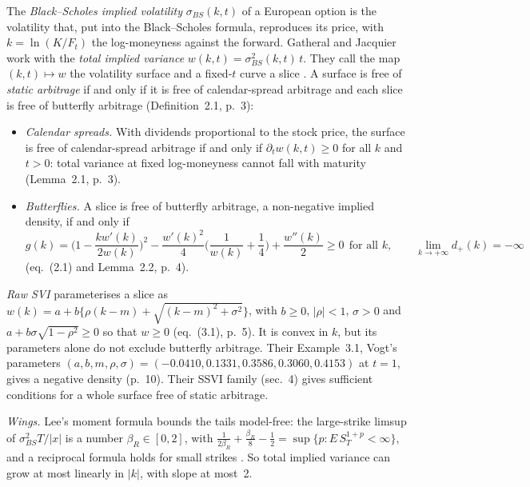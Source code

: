 \begin{qfdefinition}\label{def:implied-volatility-surface}
 The \emph{Black--Scholes implied volatility} $\sigma_{BS}(k,t)$ of a European option is the volatility that, put into the Black--Scholes formula, reproduces its price, with $k=\ln(K/F_t)$ the log-moneyness against the forward. Gatheral and Jacquier work with the \emph{total implied variance} $w(k,t)=\sigma_{BS}^2(k,t)\,t$. They call the map $(k,t)\mapsto w$ the volatility surface and a fixed-$t$ curve a slice \citep[``Notations'', p.~2]{exp-gatheral-jacquier-svi}. A surface is free of \emph{static arbitrage} if and only if it is free of calendar-spread arbitrage and each slice is free of butterfly arbitrage (Definition~2.1, p.~3):
\begin{itemize}
\item \emph{Calendar spreads.} With dividends proportional to the stock price, the surface is free of calendar-spread arbitrage if and only if $\partial_tw(k,t)\ge0$ for all $k$ and $t>0$: total variance at fixed log-moneyness cannot fall with maturity (Lemma~2.1, p.~3).
\item \emph{Butterflies.} A slice is free of butterfly arbitrage, a non-negative implied density, if and only if
\[ g(k)=\Big(1-\frac{kw'(k)}{2w(k)}\Big)^2-\frac{w'(k)^2}{4}\Big(\frac1{w(k)}+\frac14\Big)+\frac{w''(k)}2\ge0\ \ \text{for all }k,\qquad\lim_{k\to+\infty}d_+(k)=-\infty \]
(eq.~(2.1) and Lemma~2.2, p.~4).
\end{itemize}
\emph{Raw SVI} parameterises a slice as $w(k)=a+b\{\rho(k-m)+\sqrt{(k-m)^2+\sigma^2}\}$, with $b\ge0$, $|\rho|<1$, $\sigma>0$ and $a+b\sigma\sqrt{1-\rho^2}\ge0$ so that $w\ge0$ (eq.~(3.1), p.~5). It is convex in $k$, but its parameters alone do not exclude butterfly arbitrage. Their Example~3.1, Vogt's parameters $(a,b,m,\rho,\sigma)=(-0.0410,0.1331,0.3586,0.3060,0.4153)$ at $t=1$, gives a negative density (p.~10). Their SSVI family (sec.~4) gives sufficient conditions for a whole surface free of static arbitrage.

\emph{Wings.} Lee's moment formula bounds the tails model-free: the large-strike limsup of $\sigma_{BS}^2T/|x|$ is a number $\beta_R\in[0,2]$, with $\frac1{2\beta_R}+\frac{\beta_R}8-\frac12=\sup\{p:E\,S_T^{1+p}<\infty\}$, and a reciprocal formula holds for small strikes \citep[sec.~1, eq.~(1.1), p.~2; Theorems~3.2 and~3.4]{exp-lee-wings}. So total implied variance can grow at most linearly in $|k|$, with slope at most~2.


\end{qfdefinition}

